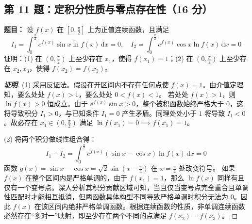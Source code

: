\documentclass[11pt,a4paper]{article}
\newcommand{\dd}{\mathrm{d}}
\begin{document}
	\begin{tcolorbox}[examstyle]
		\subsection*{第 11 题：定积分性质与零点存在性（16 分）}
		\textbf{题目：} 设 $f(x)$ 在 $[0, \frac{\pi}{2}]$ 上为正值连续函数，且满足
		$$ I_1 = \int_0^{\frac{\pi}{2}} e^{f(x)}\sin x \ln f(x) \,\dd x = 0, \quad I_2 = \int_0^{\frac{\pi}{2}} e^{f(x)}\cos x \ln f(x) \,\dd x = 0 $$
		证明：(1) 在 $(0, \frac{\pi}{2})$ 上至少存在 $x_1$，使得 $f(x_1) = 1$；(2) 在 $(0, \frac{\pi}{2})$ 上至少存在 $x_2, x_3$，使得 $f(x_2) = f(x_3)$。
		
		\begin{proof}[\textbf{证明}]
			(1) 采用反证法。假设在开区间内不存在任何点使 $f(x)=1$。由介值定理知，要么处处 $f(x)>1$，要么处处 $0<f(x)<1$。
			若处处 $f(x)>1$，则 $\ln f(x)>0$ 恒成立。由于 $e^{f(x)}\sin x >0$，整个被积函数始终严格大于 $0$，这将导致积分 $I_1 > 0$，与已知条件 $I_1=0$ 产生矛盾。同理处处小于 $1$ 将导致 $I_1<0$。故必存在 $x_1 \in (0, \frac{\pi}{2})$ 满足 $\ln f(x_1)=0 \implies f(x_1)=1$。
			
			(2) 将两个积分做线性组合得：
			$$ I_1 - I_2 = \int_0^{\frac{\pi}{2}} e^{f(x)} (\sin x - \cos x) \ln f(x) \,\dd x = 0 $$
			函数 $g(x) = \sin x - \cos x = \sqrt{2}\sin(x - \frac{\pi}{4})$ 在 $x=\frac{\pi}{4}$ 处改变符号。
			如果 $f(x)$ 在整个区间内是严格单调的，由于 $f(x_1)=1$，那么 $\ln f(x)$ 同样有且仅有一个变号点。深入分析其积分贡献区域可知，当且仅当变号点完全重合且单调性匹配时才能相互抵消，但两函数具体构型不同导致严格单调时积分无法为 $0$。因此 $f(x)$ 在该区间内绝非严格单调函数。根据连续函数的性质，非单调连续函数必然存在“多对一”映射，即至少存在两个不同的点满足 $f(x_2) = f(x_3)$。
		\end{proof}
	\end{tcolorbox}
	
\end{document}

